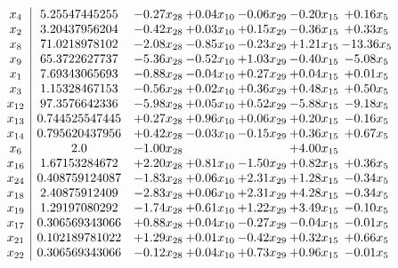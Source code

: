 \documentclass[8pt]{article}
\begin{document}
\[\begin{array}{c| c c@{\hskip 2pt} c@{\hskip 2pt} c@{\hskip 2pt} c@{\hskip 2pt} c@{\hskip 2pt} }
 x_{4}   &  5.25547445255 & -0.27 x_{28} & +  0.04 x_{10} & -0.06 x_{29} & -0.20 x_{15} & +  0.16 x_{5}\\
 x_{2}   &  3.20437956204 & -0.42 x_{28} & +  0.03 x_{10} & +  0.15 x_{29} & -0.36 x_{15} & +  0.33 x_{5}\\
 x_{8}   &  71.0218978102 & -2.08 x_{28} & -0.85 x_{10} & -0.23 x_{29} & +  1.21 x_{15} & -13.36 x_{5}\\
 x_{9}   &  65.3722627737 & -5.36 x_{28} & -0.52 x_{10} & +  1.03 x_{29} & -0.40 x_{15} & -5.08 x_{5}\\
 x_{1}   &  7.69343065693 & -0.88 x_{28} & -0.04 x_{10} & +  0.27 x_{29} & +  0.04 x_{15} & +  0.01 x_{5}\\
 x_{3}   &  1.15328467153 & -0.56 x_{28} & +  0.02 x_{10} & +  0.36 x_{29} & +  0.48 x_{15} & +  0.50 x_{5}\\
 x_{12}   &  97.3576642336 & -5.98 x_{28} & +  0.05 x_{10} & +  0.52 x_{29} & -5.88 x_{15} & -9.18 x_{5}\\
 x_{13}   &  0.744525547445 & +  0.27 x_{28} & +  0.96 x_{10} & +  0.06 x_{29} & +  0.20 x_{15} & -0.16 x_{5}\\
 x_{14}   &  0.795620437956 & +  0.42 x_{28} & -0.03 x_{10} & -0.15 x_{29} & +  0.36 x_{15} & +  0.67 x_{5}\\
 x_{6}   &  2.0 & -1.00 x_{28} &    &   & +  4.00 x_{15} &   \\
 x_{16}   &  1.67153284672 & +  2.20 x_{28} & +  0.81 x_{10} & -1.50 x_{29} & +  0.82 x_{15} & +  0.36 x_{5}\\
 x_{24}   &  0.408759124087 & -1.83 x_{28} & +  0.06 x_{10} & +  2.31 x_{29} & +  1.28 x_{15} & -0.34 x_{5}\\
 x_{18}   &  2.40875912409 & -2.83 x_{28} & +  0.06 x_{10} & +  2.31 x_{29} & +  4.28 x_{15} & -0.34 x_{5}\\
 x_{19}   &  1.29197080292 & -1.74 x_{28} & +  0.61 x_{10} & +  1.22 x_{29} & +  3.49 x_{15} & -0.10 x_{5}\\
 x_{17}   &  0.306569343066 & +  0.88 x_{28} & +  0.04 x_{10} & -0.27 x_{29} & -0.04 x_{15} & -0.01 x_{5}\\
 x_{21}   &  0.102189781022 & +  1.29 x_{28} & +  0.01 x_{10} & -0.42 x_{29} & +  0.32 x_{15} & +  0.66 x_{5}\\
 x_{22}   &  0.306569343066 & -0.12 x_{28} & +  0.04 x_{10} & +  0.73 x_{29} & +  0.96 x_{15} & -0.01 x_{5}\\

\end{array}\]
\end{document}
